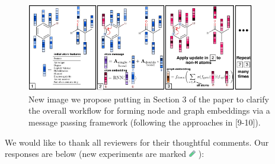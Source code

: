 \documentclass{article}
\begin{document}


\begin{figure}
\centering
\vspace{-1pt}
  \includegraphics[width=10cm]{graph_nn.pdf}
  \vspace{-18pt}
 \caption{New image we propose putting in Section 3 of the paper to clarify the overall workflow for forming node and graph embeddings via a message passing framework (following the approaches in [9-10]).}
 \label{fig:new-diagram}
 \vspace{-5ex}
\end{figure}

We would like to thank all reviewers for their thoughtful comments. 
Our responses are below (new experiments are marked \includegraphics[width=0.3cm]{testtube.png}
):
\end{document}
